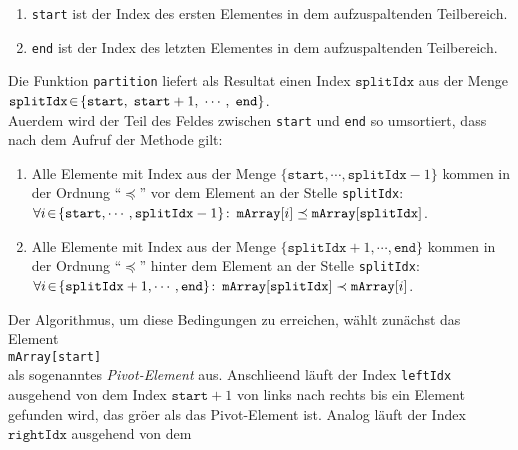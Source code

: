 \begin{enumerate}
      \begin{enumerate}
      \item \texttt{start} ist der Index des ersten  Elementes in dem aufzuspaltenden Teilbereich.
      \item \texttt{end}   ist der Index des letzten Elementes in dem aufzuspaltenden Teilbereich.
      \end{enumerate}
      Die Funktion \texttt{partition} 
      liefert als Resultat einen Index $\mathtt{splitIdx}$ aus der Menge \\[0.2cm]
      \hspace*{1.3cm} 
      $\mathtt{splitIdx} \!\in\! \{ \mathtt{start},\; \mathtt{start}+1,\; \cdots,\; \mathtt{end} \}$.\\[0.2cm]
      Au\3erdem wird der Teil des Feldes zwischen \texttt{start} und \texttt{end} so
      umsortiert, dass nach dem Aufruf der Methode gilt:
      \begin{enumerate}
      \item Alle Elemente mit Index aus der Menge $\{\mathtt{start}, \cdots,
        \mathtt{splitIdx}-1\}$ kommen in der Ordnung
            ``$\preceq$'' vor dem Element an der Stelle \texttt{splitIdx}: \\[0.2cm]
            \hspace*{1.3cm} 
            $\forall i \!\in\! \{\mathtt{start}, \cdots, \mathtt{splitIdx}-1\} \colon\, \mathtt{mArray}[i] \preceq \mathtt{mArray}[\mathtt{splitIdx}]$.
      \item Alle Elemente mit Index aus der Menge $\{\mathtt{splitIdx}+1, \cdots, \mathtt{end}\}$ kommen
            in der Ordnung ``$\preceq$'' hinter dem Element an der Stelle \texttt{splitIdx}: \\[0.2cm]
            \hspace*{1.3cm} 
            $\forall i \!\in\! \{\mathtt{splitIdx}+1, \cdots, \mathtt{end}\} \colon\, \mathtt{mArray}[\mathtt{splitIdx}]\prec \mathtt{mArray}[i]$.
      \end{enumerate}
      Der Algorithmus, um diese Bedingungen zu erreichen,  w\"ahlt zun\"achst das Element
      \\[0.2cm]
      \hspace*{1.3cm}
      \texttt{mArray[start]} 
      \\[0.2cm]
      als sogenanntes \emph{Pivot-Element} aus.  Anschlie\3end l\"auft der Index \texttt{leftIdx} ausgehend von
      dem Index $\texttt{start} + 1$ von links nach rechts bis ein Element gefunden wird, das gr\"o\3er als 
      das Pivot-Element ist. Analog l\"auft der Index $\mathtt{rightIdx}$ ausgehend von dem

\end{enumerate}
